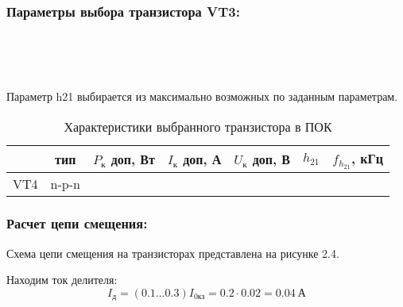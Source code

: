 \subsubsection{Параметры выбора транзистора VT3:}
\begin{equation}
\label{eq:equation3_6}

\end{equation}

\begin{equation}
\label{eq:equation3_7}

\end{equation}

\begin{equation}
\label{eq:equation3_8}

\end{equation}

\begin{equation}
\label{eq:equation3_9}

\end{equation}

\begin{equation}
\label{eq:equation3_10}

\end{equation}

Параметр h21 выбирается из максимально возможных по заданным параметрам.

\begin{table}[htbp]
\caption{Характеристики выбранного транзистора в ПОК}
\begin{center}\begin{tabular}{|c|c|c|c|c|c|c|}
\hline 
  & тип & $P_{\text{к}}$ доп, Вт & $I_{\text{к}}$ доп, А & $U_{\text{к}}$ доп, В & $h_{21}$ &  $f_{h_{21}}$, кГц \\ 
\hline 
VT4 & n-p-n &   &  &  &  & \\ 
\hline 
\end{tabular} 
\end{center}
\end{table}

\subsubsection{Расчет цепи смещения:}

Схема цепи смещения на транзисторах представлена на рисунке 2.4. \par
Находим ток делителя:
\begin{equation}
\label{eq:equation3_11}
 I_{\text{д}} = (0.1 \ldots 0.3) I_{\text{0кз}} = 0.2 \cdot 0.02 = 0.04~\text{А}
\end{equation}


